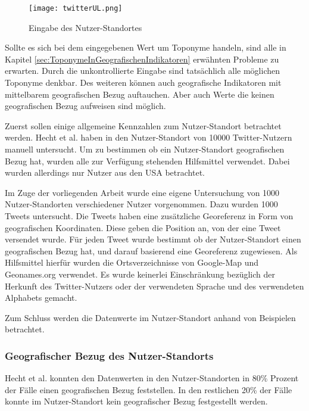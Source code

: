 			\begin{figure}[!ht]
					\begin{center}
						\texttt{[image: twitterUL.png]}
						\caption{Eingabe des Nutzer-Standortes}
						\label{img:twitterLocation}
					\end{center}
				\end{figure}	



			Sollte es sich bei dem eingegebenen Wert um Toponyme handeln, sind alle in Kapitel \ref{sec:ToponymeInGeografischenIndikatoren} erwähnten Probleme zu erwarten.
			Durch die unkontrollierte Eingabe sind tatsächlich alle möglichen Toponyme denkbar.
			Des weiteren können auch geografische Indikatoren mit mittelbarem geografischen Bezug auftauchen.
			Aber auch Werte die keinen geografischen Bezug aufweisen sind möglich.	

			Zuerst sollen einige allgemeine Kennzahlen zum Nutzer-Standort betrachtet werden.
			Hecht et al. haben in \cite{Hecht2011} den Nutzer-Standort von 10000 Twitter-Nutzern manuell untersucht.
			Um zu bestimmen ob ein Nutzer-Standort geografischen Bezug hat, wurden alle zur Verfügung stehenden Hilfsmittel verwendet.
			Dabei wurden allerdings nur Nutzer aus den USA betrachtet.

			Im Zuge der vorliegenden Arbeit wurde eine eigene Untersuchung von 1000 Nutzer-Standorten verschiedener Nutzer vorgenommen.
			Dazu wurden 1000 Tweets untersucht.
			Die Tweets haben eine zusätzliche Georeferenz in Form von geografischen Koordinaten.
			Diese geben die Position an, von der eine Tweet versendet wurde.
			Für jeden Tweet wurde bestimmt ob der Nutzer-Standort einen geografischen Bezug hat, und darauf basierend eine Georeferenz zugewiesen.
			Als Hilfsmittel hierfür wurden die Ortsverzeichnisse von Google-Map und Geonames.org verwendet.
			Es wurde keinerlei Einschränkung bezüglich der Herkunft des Twitter-Nutzers oder der verwendeten Sprache und des verwendeten Alphabets gemacht.

			Zum Schluss werden die Datenwerte im Nutzer-Standort anhand von Beispielen betrachtet.


			\subsubsection{Geografischer Bezug des Nutzer-Standorts} 
				
				Hecht et al. konnten den Datenwerten in den Nutzer-Standorten in 80\% Prozent der Fälle einen geografischen Bezug feststellen.
				In den restlichen 20\% der Fälle konnte im Nutzer-Standort kein geografischer Bezug festgestellt werden. 

